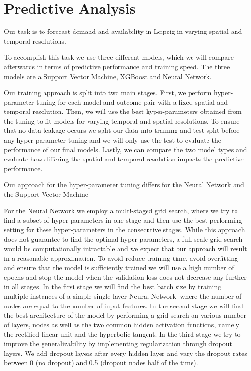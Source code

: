 \clearpage
\section{Predictive Analysis}
\label{sec:predictive_analysis}

Our task is to forecast demand and availability in Leipzig in varying spatial and temporal resolutions.

To accomplish this task we use three different models, which we will compare afterwards in terms of predictive performance and training speed. 
The three models are a Support Vector Machine, XGBoost and Neural Network.  

Our training approach is split into two main stages.
First, we perform hyper-parameter tuning for each model and outcome pair with a fixed spatial and temporal resolution. Then, we will use the best hyper-parameters obtained from the tuning to fit models for varying temporal and spatial resolutions.
To ensure that no data leakage occurs we split our data into training and test split before any hyper-parameter tuning and we will only use the test to evaluate the performance of our final models.
Lastly, we can compare the two model types and evaluate how differing the spatial and temporal resolution impacts the predictive performance.  


Our approach for the hyper-parameter tuning differs for the Neural Network and the Support Vector Machine. 

For the Neural Network we employ a multi-staged grid search, where we try to find a subset of hyper-parameters in one stage and then use the best performing setting for these hyper-parameters in the consecutive stages.
While this approach does not guarantee to find the optimal hyper-parameters, a full scale grid search would be computationally intractable and we expect that our approach will result in a reasonable approximation.
To avoid reduce training time, avoid overfitting and ensure that the model is sufficiently trained we will use a high number of epochs and stop the model when the validation loss does not decrease any further in all stages.
In the first stage we will find the best batch size by training multiple instances of a simple single-layer Neural Network, where the number of nodes are equal to the number of input features.
In the second stage we will find the best architecture of the model by performing a grid search on various number of layers, nodes as well as the two common hidden activation functions, namely the rectified linear unit and the hyperbolic tangent.
In the third stage we try to improve the generalizability by implementing regularization through dropout layers.
We add dropout layers after every hidden layer and vary the dropout rates between 0 (no dropout) and 0.5 (dropout nodes half of the time).

